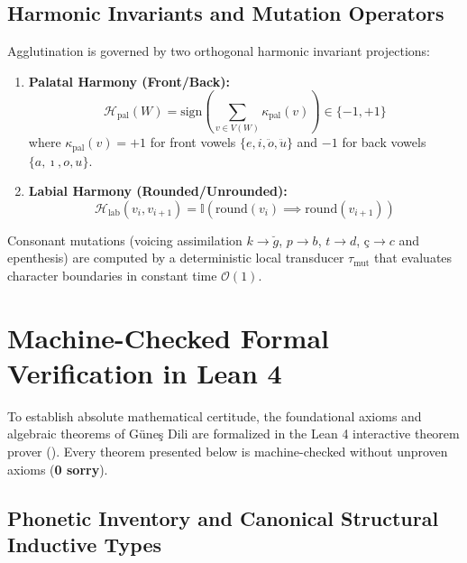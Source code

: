 \documentclass[11pt,letterpaper]{article}
\begin{document}
\subsection{Harmonic Invariants and Mutation Operators}

Agglutination is governed by two orthogonal harmonic invariant projections:
\begin{enumerate}
    \item \textbf{Palatal Harmony (Front/Back):}
    \begin{equation}
    \mathcal{H}_{\text{pal}}(W) = \text{sign}\left( \sum_{v \in V(W)} \kappa_{\text{pal}}(v) \right) \in \{-1, +1\}
    \end{equation}
    where $\kappa_{\text{pal}}(v) = +1$ for front vowels $\{e, i, \ddot{o}, \ddot{u}\}$ and $-1$ for back vowels $\{a, \imath, o, u\}$.
    \item \textbf{Labial Harmony (Rounded/Unrounded):}
    \begin{equation}
    \mathcal{H}_{\text{lab}}(v_i, v_{i+1}) = \mathbb{I}\left( \text{round}(v_i) \implies \text{round}(v_{i+1}) \right)
    \end{equation}
\end{enumerate}

Consonant mutations (voicing assimilation $k \to \breve{g}$, $p \to b$, $t \to d$, $\text{\c{c}} \to c$ and epenthesis) are computed by a deterministic local transducer $\tau_{\text{mut}}$ that evaluates character boundaries in constant time $\mathcal{O}(1)$.

\section{Machine-Checked Formal Verification in Lean 4}

To establish absolute mathematical certitude, the foundational axioms and algebraic theorems of G\"{u}ne\c{s} Dili are formalized in the Lean 4 interactive theorem prover (). Every theorem presented below is machine-checked without unproven axioms (\textbf{0 sorry}).

\subsection{Phonetic Inventory and Canonical Structural Inductive Types}
\end{document}
